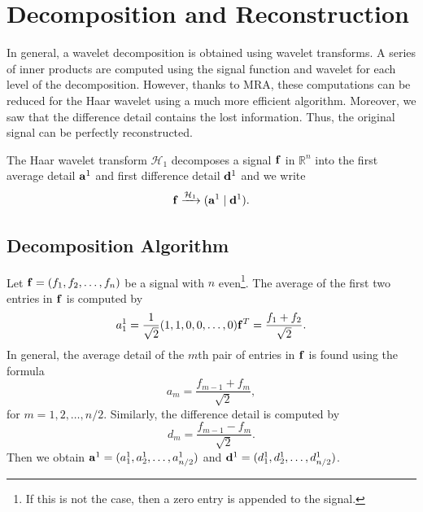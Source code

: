 \documentclass{article}
\def\RR{\mathbb{R}}
\theoremstyle{definition}
\begin{document}
  \section{Decomposition and Reconstruction}

  In general, a wavelet decomposition is obtained using wavelet transforms. A series of inner products are computed using the signal function and wavelet for each level of the decomposition. However, thanks to MRA, these computations can be reduced for the Haar wavelet using a much more efficient algorithm. Moreover, we saw that the difference detail contains the lost information. Thus, the original signal can be perfectly reconstructed.

  The Haar wavelet transform \(\mathcal{H}_1\) decomposes a signal \(\vb{f}\) in \(\RR^n\) into the first average detail \(\vb{a}^1\) and first difference detail \(\vb{d}^1\) and we write
  \begin{equation}
    \vb{f} \xrightarrow{\mathcal{H}_1} (\vb{a}^1 \mid \vb{d}^1).
  \end{equation}

  \subsection{Decomposition Algorithm}

  Let \(\vb{f} = (f_1, f_2, \dots, f_n)\) be a signal with \(n\) even\footnote{If this is not the case, then a zero entry is appended to the signal.}. The average of the first two entries in \(\vb{f}\) is computed by
  \[a_1^1 = \frac{1}{\sqrt{2}} (1,1,0,0,\dots,0) \vb{f}^T = \frac{f_1 + f_2}{\sqrt{2}}.\]
  In general, the average detail of the \(m\)th pair of entries in \(\vb{f}\) is found using the formula
  \begin{equation} \label{eqn:avg-detail}
    a_m = \frac{f_{m-1} + f_{m}}{\sqrt{2}},
  \end{equation}
  for \(m = 1, 2, \dots, n/2\). Similarly, the difference detail is computed by
  \begin{equation} \label{eqn:diff-detail}
    d_m = \frac{f_{m-1} - f_{m}}{\sqrt{2}}.
  \end{equation}
  Then we obtain \(\vb{a}^1 = (a_1^1, a_2^1, \dots, a_{n/2}^1)\) and \(\vb{d}^1 = (d_1^1, d_2^1, \dots, d_{n/2}^1)\).
\end{document}
